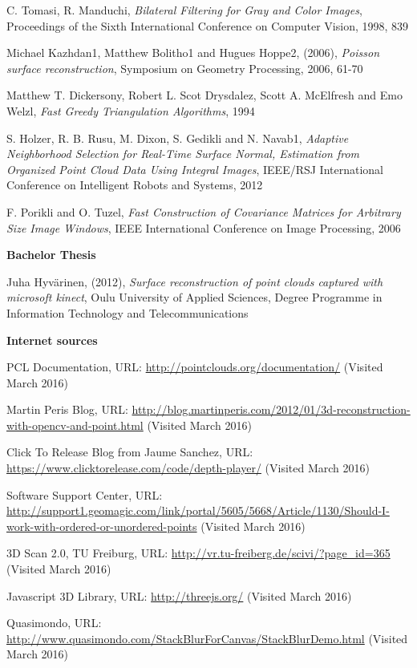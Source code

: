 \documentclass[paper=a4,11pt,bibliography=totoc]{scrartcl}
\begin{document}
\begin{thebibliography}{185}

C. Tomasi, R. Manduchi, \textit{Bilateral Filtering for Gray and Color Images}, Proceedings of the Sixth International Conference on Computer Vision, 1998, 839

Michael Kazhdan1, Matthew Bolitho1 and Hugues Hoppe2, (2006), \textit{Poisson surface reconstruction}, Symposium on Geometry Processing, 2006, 61-70

Matthew T. Dickersony, Robert L. Scot Drysdalez, Scott A. McElfresh and Emo Welzl, \textit{Fast Greedy Triangulation Algorithms}, 1994

S. Holzer, R. B. Rusu, M. Dixon, S. Gedikli and N. Navab1, \textit{Adaptive Neighborhood Selection for Real-Time Surface Normal, Estimation from Organized Point Cloud Data Using Integral Images}, IEEE/RSJ International Conference on Intelligent Robots and Systems, 2012

F. Porikli and O. Tuzel, \textit{Fast Construction of Covariance Matrices for Arbitrary Size Image Windows}, IEEE International Conference on
Image Processing, 2006


{\textbf{Bachelor Thesis}}

Juha Hyvärinen, (2012), \textit{Surface reconstruction of point clouds captured with microsoft kinect}, Oulu University of Applied Sciences, Degree Programme in Information Technology and Telecommunications

{\textbf{Internet sources}}

PCL Documentation, URL: \url{http://pointclouds.org/documentation/} (Visited March 2016)

Martin Peris Blog, URL: \url{http://blog.martinperis.com/2012/01/3d-reconstruction-with-opencv-and-point.html} (Visited March 2016)

Click To Release Blog from Jaume Sanchez, URL: \url{https://www.clicktorelease.com/code/depth-player/} (Visited March 2016)

Software Support Center, URL: \url{http://support1.geomagic.com/link/portal/5605/5668/Article/1130/Should-I-work-with-ordered-or-unordered-points} (Visited March 2016)

3D Scan 2.0, TU Freiburg, URL: \url{http://vr.tu-freiberg.de/scivi/?page_id=365} (Visited March 2016)

Javascript 3D Library, URL: \url{http://threejs.org/} (Visited March 2016)

Quasimondo, URL: \url{http://www.quasimondo.com/StackBlurForCanvas/StackBlurDemo.html} (Visited March 2016)

\end{thebibliography}
\end{document}
